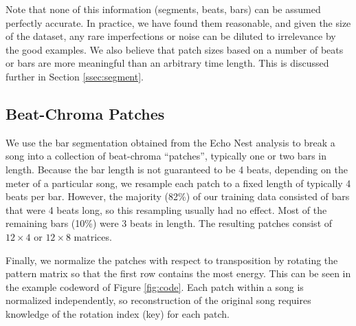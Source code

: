 \documentclass{article}
\newcommand{\eg}{e.g.~}
\begin{document}
Note that none of this information (segments, beats, bars)
can be assumed perfectly accurate.
In practice, we have found them reasonable, 
and given the size of the dataset, any rare imperfections or noise
can be diluted to irrelevance by the good examples.  
We also believe that patch sizes based on a number of beats or bars are more
meaningful than an arbitrary time length. This is discussed further in 
Section \ref{ssec:segment}.


\subsection{Beat-Chroma Patches} \label{ssec:beatpatch}

We use the bar segmentation obtained from the Echo Nest analysis to
break a song into a collection of beat-chroma ``patches'', typically
one or two bars in length.
%
Because the bar length is not guaranteed to be 4 beats, 
depending on the meter of a particular
song, we resample each patch to a fixed length of typically 4 beats
per bar.  However, the majority (82\%) of our training data
consisted of bars that were 4 beats long, so this resampling 
usually had no effect.  Most of the remaining bars (10\%) were 3 beats in
length.
The resulting patches consist of $12 \times 4$ or $12 \times 8$ matrices.

Finally, we normalize the patches with respect to transposition by rotating
the pattern matrix so that the first row contains the most
energy. This can be seen in the example codeword of Figure \ref{fig:code}.
Each patch within a song is normalized independently, so
reconstruction of the original song requires knowledge of the
rotation index (key) for each patch.
\end{document}
